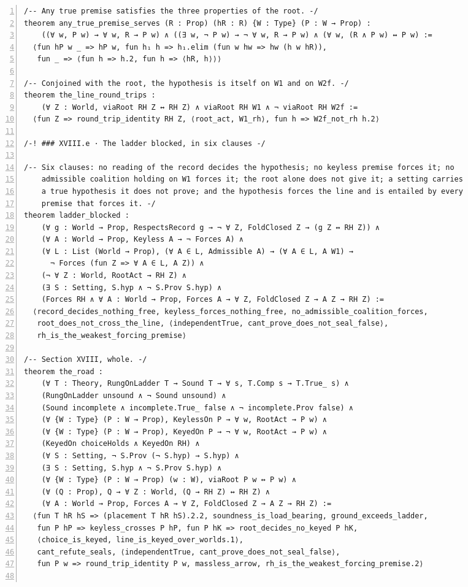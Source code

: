 \documentclass[10pt]{article}
\newcommand{\leansize}{\fontsize{5.5pt}{6.75pt}\selectfont}
\begin{document}
\begin{multicols}{2}
\begin{Verbatim}[numbers=left,firstnumber=1,numbersep=3pt,xleftmargin=2.6em,breaklines=true,breakanywhere=true,breakautoindent=false,breakindent=1.4em,breaksymbolleft={},breakanywheresymbolpre={},fontsize=\leansize]
/-- Any true premise satisfies the three properties of the root. -/
theorem any_true_premise_serves (R : Prop) (hR : R) {W : Type} (P : W → Prop) :
    ((∀ w, P w) → ∀ w, R → P w) ∧ ((∃ w, ¬ P w) → ¬ ∀ w, R → P w) ∧ (∀ w, (R ∧ P w) ↔ P w) :=
  ⟨fun hP w _ => hP w, fun h₁ h => h₁.elim (fun w hw => hw (h w hR)),
   fun _ => ⟨fun h => h.2, fun h => ⟨hR, h⟩⟩⟩

/-- Conjoined with the root, the hypothesis is itself on W1 and on W2f. -/
theorem the_line_round_trips :
    (∀ Z : World, viaRoot RH Z ↔ RH Z) ∧ viaRoot RH W1 ∧ ¬ viaRoot RH W2f :=
  ⟨fun Z => round_trip_identity RH Z, ⟨root_act, W1_rh⟩, fun h => W2f_not_rh h.2⟩

/-! ### XVIII.e · The ladder blocked, in six clauses -/

/-- Six clauses: no reading of the record decides the hypothesis; no keyless premise forces it; no
    admissible coalition holding on W1 forces it; the root alone does not give it; a setting carries
    a true hypothesis it does not prove; and the hypothesis forces the line and is entailed by every
    premise that forces it. -/
theorem ladder_blocked :
    (∀ g : World → Prop, RespectsRecord g → ¬ ∀ Z, FoldClosed Z → (g Z ↔ RH Z)) ∧
    (∀ A : World → Prop, Keyless A → ¬ Forces A) ∧
    (∀ L : List (World → Prop), (∀ A ∈ L, Admissible A) → (∀ A ∈ L, A W1) →
      ¬ Forces (fun Z => ∀ A ∈ L, A Z)) ∧
    (¬ ∀ Z : World, RootAct → RH Z) ∧
    (∃ S : Setting, S.hyp ∧ ¬ S.Prov S.hyp) ∧
    (Forces RH ∧ ∀ A : World → Prop, Forces A → ∀ Z, FoldClosed Z → A Z → RH Z) :=
  ⟨record_decides_nothing_free, keyless_forces_nothing_free, no_admissible_coalition_forces,
   root_does_not_cross_the_line, ⟨independentTrue, cant_prove_does_not_seal_false⟩,
   rh_is_the_weakest_forcing_premise⟩

/-- Section XVIII, whole. -/
theorem the_road :
    (∀ T : Theory, RungOnLadder T → Sound T → ∀ s, T.Comp s → T.True_ s) ∧
    (RungOnLadder unsound ∧ ¬ Sound unsound) ∧
    (Sound incomplete ∧ incomplete.True_ false ∧ ¬ incomplete.Prov false) ∧
    (∀ {W : Type} (P : W → Prop), KeylessOn P → ∀ w, RootAct → P w) ∧
    (∀ {W : Type} (P : W → Prop), KeyedOn P → ¬ ∀ w, RootAct → P w) ∧
    (KeyedOn choiceHolds ∧ KeyedOn RH) ∧
    (∀ S : Setting, ¬ S.Prov (¬ S.hyp) → S.hyp) ∧
    (∃ S : Setting, S.hyp ∧ ¬ S.Prov S.hyp) ∧
    (∀ {W : Type} (P : W → Prop) (w : W), viaRoot P w ↔ P w) ∧
    (∀ (Q : Prop), Q → ∀ Z : World, (Q → RH Z) ↔ RH Z) ∧
    (∀ A : World → Prop, Forces A → ∀ Z, FoldClosed Z → A Z → RH Z) :=
  ⟨fun T hR hS => (placement T hR hS).2.2, soundness_is_load_bearing, ground_exceeds_ladder,
   fun P hP => keyless_crosses P hP, fun P hK => root_decides_no_keyed P hK,
   ⟨choice_is_keyed, line_is_keyed_over_worlds.1⟩,
   cant_refute_seals, ⟨independentTrue, cant_prove_does_not_seal_false⟩,
   fun P w => round_trip_identity P w, massless_arrow, rh_is_the_weakest_forcing_premise.2⟩


\end{Verbatim}
\end{multicols}
\end{document}
